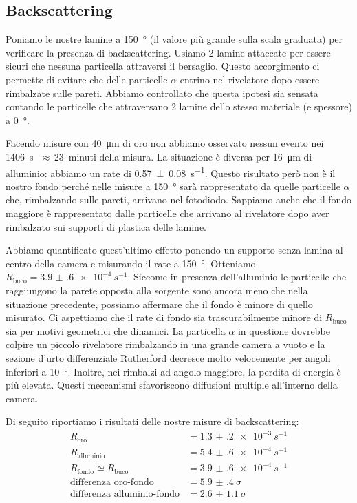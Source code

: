 \subsection{Backscattering}

Poniamo le nostre lamine a \SI{150}{\degree} (il valore più grande sulla scala graduata) per verificare la presenza di backscattering. Usiamo 2 lamine attaccate per essere sicuri che nessuna particella attraversi il bersaglio. Questo accorgimento ci permette di evitare che delle particelle $\alpha$ entrino nel rivelatore dopo essere rimbalzate sulle pareti. Abbiamo controllato che questa ipotesi sia sensata contando le particelle che attraversano 2 lamine dello stesso materiale (e spessore) a \SI{0}{\degree}.

Facendo misure con \SI{40}{\micro m} di oro non abbiamo osservato nessun evento nei \SI{1406}s\,$\approx$\,\SI{23}{minuti} della misura. La situazione è diversa per \SI{16}{\micro m} di alluminio: abbiamo un rate di \SI{0.57(8)}{s^{-1}}.
Questo risultato però non è il nostro fondo perché nelle misure a \SI{150}{\degree} sarà rappresentato da quelle particelle $\alpha$ che, rimbalzando sulle pareti, arrivano nel fotodiodo. Sappiamo anche che il fondo maggiore è rappresentato dalle particelle che arrivano al rivelatore dopo aver rimbalzato sui supporti di plastica delle lamine.

Abbiamo quantificato quest'ultimo effetto ponendo un supporto senza lamina al centro della camera e misurando il rate a \SI{150}{\degree}. Otteniamo $R_{\text{buco}}=\SI{3.9(6)e-4}{s^{-1}}$.
Siccome in presenza dell'alluminio le particelle che raggiungono la parete opposta alla sorgente sono ancora meno che nella situazione precedente, possiamo affermare che il fondo è minore di quello misurato. Ci aspettiamo che il rate di fondo sia trascurabilmente minore di $R_{\text{buco}}$ sia per motivi geometrici che dinamici. La particella $\alpha$ in questione dovrebbe colpire un piccolo rivelatore rimbalzando in una grande camera a vuoto e la sezione d'urto differenziale Rutherford decresce molto velocemente per angoli inferiori a \SI{10}{\degree}. Inoltre, nei rimbalzi ad angolo maggiore, la perdita di energia è più elevata. Questi meccanismi sfavoriscono diffusioni multiple all'interno della camera.

Di seguito riportiamo i risultati delle nostre misure di backscattering:
\begin{align*}
R_{\text{oro}} &= \SI{1.3(2)e-3}{s^{-1}} \\
R_{\text{alluminio}} &= \SI{5.4(6)e-4}{s^{-1}} \\
R_{\text{fondo}} \simeq R_{\text{buco}} &= \SI{3.9(6)e-4}{s^{-1}} \\
\text{differenza oro-fondo} &= \SI{5.9(4)}{\sigma} \\
\text{differenza alluminio-fondo} &= \SI{2.6(11)}{\sigma} \\
\end{align*}

